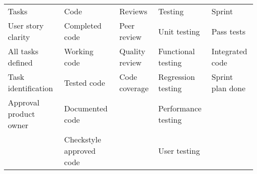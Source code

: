 \begin{tabular}{lllll}
	Tasks & Code & Reviews & Testing & Sprint \\
	User story clarity & Completed code & Peer review & Unit testing & Pass tests \\
	All tasks defined & Working code & Quality review & Functional testing & Integrated code \\
	Task identification & Tested code & Code coverage & Regression testing & Sprint plan done \\
	Approval product owner & Documented code &  & Performance testing & \\
	& Checkstyle approved code &  & User testing & \\
\end{tabular}